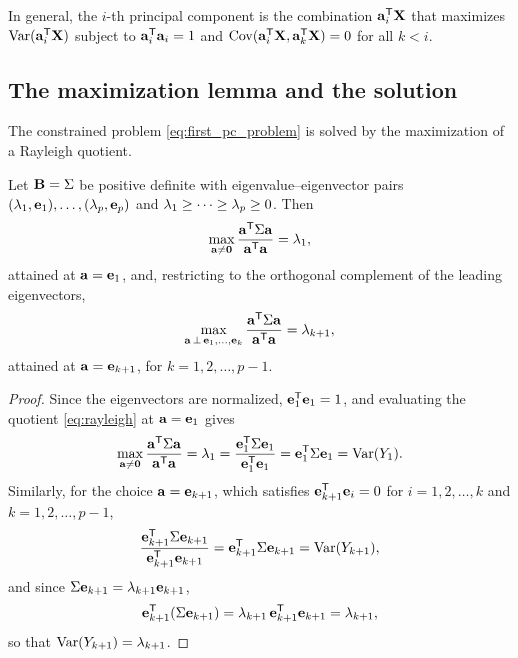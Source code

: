 In general, the $i$-th principal component is the combination
$\mathbf{a}_i^{\mathsf{T}}\mathbf{X}$ that maximizes $\operatorname{Var}(\mathbf{a}_i^{\mathsf{T}}\mathbf{X})$ subject to
$\mathbf{a}_i^{\mathsf{T}}\mathbf{a}_i=1$ and
$\operatorname{Cov}(\mathbf{a}_i^{\mathsf{T}}\mathbf{X},\mathbf{a}_k^{\mathsf{T}}\mathbf{X})=0$ for all $k<i$.

\subsection{The maximization lemma and the solution}
\label{subsec:pca_maximization}

The constrained problem \eqref{eq:first_pc_problem} is solved by the
maximization of a Rayleigh quotient.

\begin{lemma}
  Let $\mathbf{B}=\Sigma$ be positive definite with eigenvalue--eigenvector pairs
  $(\lambda_1,\mathbf{e}_1),\dots,(\lambda_p,\mathbf{e}_p)$ and $\lambda_1\ge\dots\ge\lambda_p\ge0$.
  Then
  \begin{equation}
    \label{eq:rayleigh}
    \max_{\mathbf{a}\neq\mathbf{0}}
      \frac{\mathbf{a}^{\mathsf{T}}\Sigma\mathbf{a}}{\mathbf{a}^{\mathsf{T}}\mathbf{a}}=\lambda_1,
  \end{equation}
  attained at $\mathbf{a}=\mathbf{e}_1$, and, restricting to the orthogonal complement
  of the leading eigenvectors,
  \begin{equation}
    \label{eq:rayleigh_k}
    \max_{\substack{\mathbf{a}\,\perp\,\mathbf{e}_1,\dots,\mathbf{e}_k}}
      \frac{\mathbf{a}^{\mathsf{T}}\Sigma\mathbf{a}}{\mathbf{a}^{\mathsf{T}}\mathbf{a}}=\lambda_{k+1},
  \end{equation}
  attained at $\mathbf{a}=\mathbf{e}_{k+1}$, for $k=1,2,\dots,p-1$.
\end{lemma}

\begin{proof}
  Since the eigenvectors are normalized, $\mathbf{e}_1^{\mathsf{T}}\mathbf{e}_1=1$, and
  evaluating the quotient \eqref{eq:rayleigh} at $\mathbf{a}=\mathbf{e}_1$ gives
  \[
    \max_{\mathbf{a}\neq\mathbf{0}}
      \frac{\mathbf{a}^{\mathsf{T}}\Sigma\mathbf{a}}{\mathbf{a}^{\mathsf{T}}\mathbf{a}}
    =\lambda_1
    =\frac{\mathbf{e}_1^{\mathsf{T}}\Sigma\mathbf{e}_1}{\mathbf{e}_1^{\mathsf{T}}\mathbf{e}_1}
    =\mathbf{e}_1^{\mathsf{T}}\Sigma\mathbf{e}_1
    =\operatorname{Var}(Y_1).
  \]
  Similarly, for the choice $\mathbf{a}=\mathbf{e}_{k+1}$, which satisfies
  $\mathbf{e}_{k+1}^{\mathsf{T}}\mathbf{e}_i=0$ for $i=1,2,\dots,k$ and $k=1,2,\dots,p-1$,
  \[
    \frac{\mathbf{e}_{k+1}^{\mathsf{T}}\Sigma\mathbf{e}_{k+1}}
         {\mathbf{e}_{k+1}^{\mathsf{T}}\mathbf{e}_{k+1}}
    =\mathbf{e}_{k+1}^{\mathsf{T}}\Sigma\mathbf{e}_{k+1}=\operatorname{Var}(Y_{k+1}),
  \]
  and since $\Sigma\mathbf{e}_{k+1}=\lambda_{k+1}\mathbf{e}_{k+1}$,
  \[
    \mathbf{e}_{k+1}^{\mathsf{T}}(\Sigma\mathbf{e}_{k+1})
    =\lambda_{k+1}\,\mathbf{e}_{k+1}^{\mathsf{T}}\mathbf{e}_{k+1}=\lambda_{k+1},
  \]
  so that $\operatorname{Var}(Y_{k+1})=\lambda_{k+1}$.
\end{proof}

